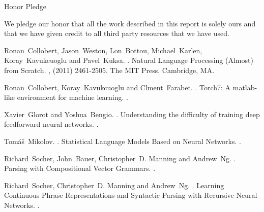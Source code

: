 \documentclass[11pt]{article}
\begin{document}
Honor Pledge

We pledge our honor that all the work described in this report is solely ours and
that we have given credit to all third party resources that we have used.

%
%

\begin{thebibliography}{}

Ronan~Collobert, Jason~Weston, Lon~Bottou, Michael~Karlen, Koray~Kavukcuoglu and Pavel~Kuksa.
.
\newblock Natural Language Processing (Almost) from Scratch.
,  (2011) 2461-2505.
\newblock The MIT Press, Cambridge, MA.

Ronan~Collobert, Koray~Kavukcuoglu and Clment~Farabet.
.
\newblock Torch7: A matlab-like environment for machine learning.
.

Xavier~Glorot and Yoshua~Bengio.
.
\newblock Understanding the difficulty of training deep feedforward neural networks.
.

Tomáš~Mikolov.
.
\newblock Statistical Language Models Based on Neural Networks.
.

Richard~Socher, John~Bauer, Christopher~D. Manning and Andrew~Ng.
.
\newblock Parsing with Compositional Vector Grammars.
.

Richard~Socher, Christopher~D. Manning and Andrew~Ng.
.
\newblock Learning Continuous Phrase Representations and
Syntactic Parsing with Recursive Neural Networks.
.

\end{thebibliography}
\end{document}
